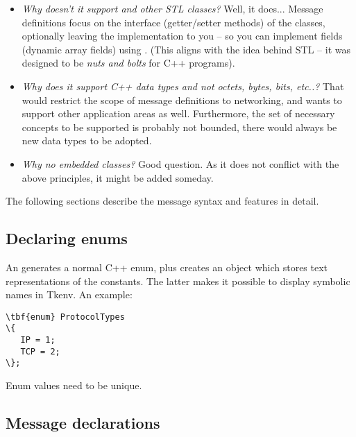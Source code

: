 \begin{itemize}
  \item{\textit{Why doesn't it support  and other STL classes?}
     Well, it does... Message definitions focus on the interface
     (getter/setter methods) of the classes, optionally leaving the implementation
     to you -- so you can implement fields (dynamic array fields)
     using .
     (This aligns with the idea behind STL -- it was designed to be
     \textit{nuts and bolts} for C++ programs).}
  \item{\textit{Why does it support C++ data types and not octets,
     bytes, bits, etc..?}
     That would restrict the scope of message definitions to networking,
     and {\opp} wants to support other application areas as well.
     Furthermore, the set of necessary concepts to be supported is
     probably not bounded, there would always be new data types to
     be adopted.}
  \item{\textit{Why no embedded classes?} Good question. As it does not
     conflict with the above principles, it might be added someday.}
\end{itemize}



The following sections describe the message syntax and features in detail.


\subsection{Declaring enums}

An  generates a normal C++ enum, plus creates an object
which stores text representations of the constants. The latter makes it possible
to display symbolic names in Tkenv.
An example:

\begin{Verbatim}[commandchars=\\\{\}]
\tbf{enum} ProtocolTypes
\{
   IP = 1;
   TCP = 2;
\};
\end{Verbatim}

Enum values need to be unique.


%

\subsection{Message declarations}

